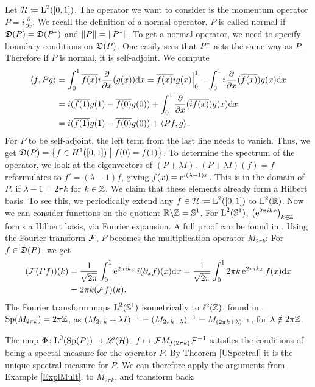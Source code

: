 \begin{expl}
 
 Let $\mathcal{H} \coloneqq \text{L}^2(\left[ 0, 1 \right])$. 
 The operator we want to consider is the momentum operator 
 $P = i \frac{\partial}{\partial x}$.
 We recall the definition of a normal operator.
 $P$ is called normal if $\mathfrak{D}(P) = \mathfrak{D}(P^{*})$ and 
 $\|P\| = \| P ^{*} \|$. To get a normal operator, we
 need to specify boundary conditions on $\mathfrak{D}(P)$. One easily sees that
 $P^{*}$ acts the same way as $P$. Therefore if $P$ is normal,
 it is self-adjoint.
 We compute
 \begin{align*}
  \left\langle f, Pg \right\rangle 
 & =\int _0 ^1 \overline{f(x)} i \frac{\partial}{\partial x}(g(x)) \text{d}x
  = \overline{f(x)}ig(x)\Bigr|^{1}_{0}
  -\int _0 ^1 i \frac{\partial}{\partial x}(\overline{f(x)}) g(x) \text{d}x\\
&= i(\overline{f(1)}g(1)- \overline{f(0)}g(0))
+ \int _0 ^1 \frac{\partial}{\partial x}(\overline{i f(x)}) g(x) \text{d}x\\
&=i(\overline{f(1)}g(1)- \overline{f(0)}g(0)) 
+\left\langle Pf, g \right\rangle.
 \end{align*}
For $P$ to be self-adjoint, the left term from the last line needs 
to vanish. Thus, we get $\mathfrak{D}(P)=
 \left\lbrace f \in H^1(\left[ 0,1 \right]) \bigm| f(0) = f(1) \right\rbrace$.
 To determine the spectrum of the operator, we look at 
 the eigenvectors of $(P+\lambda I)$.
 $(P+\lambda I)(f)=f$ reformulates to $ f' = (\lambda - 1)f$, giving
 $f(x)= \operatorname{e}^{i(\lambda -1 )x}$. This is in the domain of $P$, if 
 $\lambda-1 = 2\pi k$ for $k \in \mathbb{Z}$. We claim that these elements
 already form a Hilbert basis. To see this, we periodically
 extend any
 $f \in \mathcal{H} \coloneqq \text{L}^2(\left[ 0, 1 \right])$ to 
 $\text{L}^2(\mathbb{R})$. Now we can consider functions on the quotient 
 $\mathbb{R} \backslash \mathbb{Z} = \mathbb{S}^1$. For $\text{L}^2(\mathbb{S}^1)$,
 $\left(\operatorname{e}^{2\pi i k x }\right)_{k \in \mathbb{Z}}$ forms a Hilbert basis, via
 Fourier expansion. A full proof can be found in 
 \cite[Ch. V.4]{WernerFunkAna}.
 Using the Fourier transform $\mathcal{F}$, $P$ becomes the multiplication operator
 $M_{2 \pi k}$: For $f \in \mathfrak{D}(P)$, we get
 \begin{align*}
  (\mathcal{F}(Pf))(k)
  &= \frac{1}{\sqrt{2\pi}} \int _0 ^1 \operatorname{e}^{2\pi i k x}i(\partial_xf)(x)\text{d}x
  = \frac{1}{\sqrt{2\pi}} \int _0 ^1 2 \pi k \operatorname{e}^{2\pi i k x}f(x)\text{d}x \\
  &= 2 \pi k (\mathcal{F}f)(k).
 \end{align*}
The Fourier transform maps $\text{L}^2(\mathbb{S}^1)$ isometrically
to $\ell^2(\mathbb{Z})$, found in \cite[p. 205]{TaylorPDEI}. $\operatorname{Sp}(M_{2\pi k}) = 2\pi \mathbb{Z}$, as 
$(M_{2 \pi k } + \lambda I)^{-1} = (M_{2 \pi k + \lambda})^{-1}
= M_{(2 \pi k + \lambda)^{-1}}$, for $\lambda \notin 2\pi \mathbb{Z}$.

The map $\Phi \colon \text{L}^0(\operatorname{Sp}(P)) \to \mathscr{L}(\mathcal{H}), ~
f \mapsto \mathcal{F}M_{f(2\pi k)} \mathcal{F}^{-1}$ satisfies the conditions
of being a spectal measure for the operator $P$. By Theorem \ref{USpectral}
it is the unique spectral measure for $P$. 
We can therefore apply the arguments from Example
\ref{ExplMult}, to $M_{2 \pi k}$, and transform back.

\end{expl}

